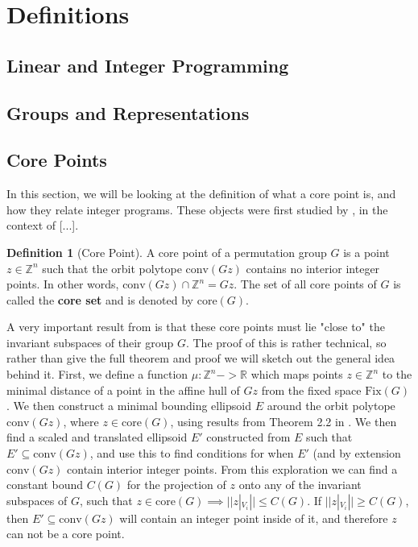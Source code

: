 \documentclass[11pt]{article} %
\theoremstyle{definition}
\newtheorem{definition}[theorem]{Definition}
\theoremstyle{remark}
\newcommand{\ZZ}{\mathbb{Z}}
\newcommand{\RR}{\mathbb{R}}
\begin{document}
\section{Definitions}

\subsection{Linear and Integer Programming}

\subsection{Groups and Representations}

\subsection{Core Points}

In this section, we will be looking at the definition of what a core point is, and how they relate integer programs. These objects were first studied by \cite{some}, in the context of [...].

\begin{definition}[Core Point]
A core point of a permutation group $G$ is a point $z \in \mathbb{Z}^n$ such that the orbit polytope $\textrm{conv}(Gz)$ contains no interior integer points. In other words, $\textrm{conv}(Gz) \cap \mathbb{Z}^n = Gz$. The set of all core points of $G$ is called the \textbf{core set} and is denoted by $\textrm{core}(G)$.
\end{definition}

A very important result from \cite{rehn} is that these core points must lie "close to" the invariant subspaces of their group $G$. The proof of this is rather technical, so rather than give the full theorem and proof we will sketch out the general idea behind it. First, we define a function $\mu : \ZZ^n -> \RR$ which maps points $z \in \ZZ^n$ to the minimal distance of a point in the affine hull of $Gz$ from the fixed space $\textrm{Fix}(G)$. We then construct a minimal bounding ellipsoid $E$ around the orbit polytope $\textrm{conv}(Gz)$, where $z \in \textrm{core}(G)$, using results from Theorem 2.2 in \cite{barvinok/blekherman}. We then find a scaled and translated ellipsoid $E'$ constructed from $E$ such that $E' \subseteq \textrm{conv}(Gz)$, and use this to find conditions for when $E'$ (and by extension $\textrm{conv}(Gz)$ contain interior integer points. From this exploration we can find a constant bound $C(G)$ for the projection of $z$ onto any of the invariant subspaces of $G$, such that $z \in \textrm{core}(G) \implies  ||z|_{V_i}|| \leq C(G)$. If $||z|_{V_i}|| \geq C(G)$, then $E' \subseteq \textrm{conv}(Gz)$ will contain an integer point inside of it, and therefore $z$ can not be a core point.
\end{document}
